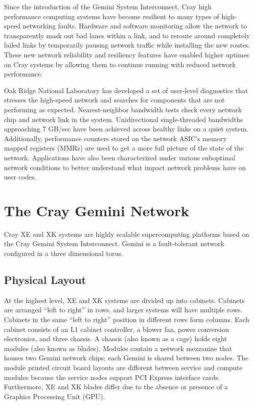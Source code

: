 \documentclass[10pt, conference, compsocconf]{IEEEtran}
\begin{document}
Since the introduction of the Gemini System Interconnect, Cray high performance
computing systems have become resilient to many types of high-speed networking
faults. Hardware and software monitoring allow the network to transparently
mask out bad lanes within a link, and to reroute around completely failed links
by temporarily pausing network traffic while installing the new routes. These
new network reliability and resiliency features have enabled higher uptimes on
Cray systems by allowing them to continue running with reduced network
performance.

Oak Ridge National Laboratory has developed a set of user-level diagnostics
that stresses the high-speed network and searches for components that are not
performing as expected. Nearest-neighbor bandwidth tests check every network
chip and network link in the system. Unidirectional single-threaded bandwidths
approaching 7 GB/sec have been achieved across healthy links on a quiet system.
Additionally, performance counters stored on the network ASIC’s memory mapped
registers (MMRs) are used to get a more full picture of the state of the
network. Applications have also been characterized under various suboptimal
network conditions to better understand what impact network problems have on
user codes.

\section{The Cray Gemini Network}

Cray XE and XK systems are highly scalable supercomputing platforms based on
the Cray Gemini System Interconnect.  Gemini is a fault-tolerant network
configured in a three dimensional torus.

\subsection{Physical Layout}

At the highest level, XE and XK systems are divided up into cabinets.  Cabinets
are arranged ``left to right'' in rows, and larger systems will have multiple
rows.  Cabinets in the same ``left to right'' position in different rows form
columns.  Each cabinet consists of an L1 cabinet controller, a blower fan,
power conversion electronics, and three chassis.  A chassis (also known as a
cage) holds eight modules (also known as blades).  Modules contain a network
mezzanine that houses two Gemini network chips; each Gemini is shared between
two nodes.  The module printed circuit board layouts are different between
service and compute modules because the service nodes support PCI Express
interface cards.  Furthermore, XE and XK blades differ due to the absence or
presence of a Graphics Processing Unit (GPU).
\end{document}
